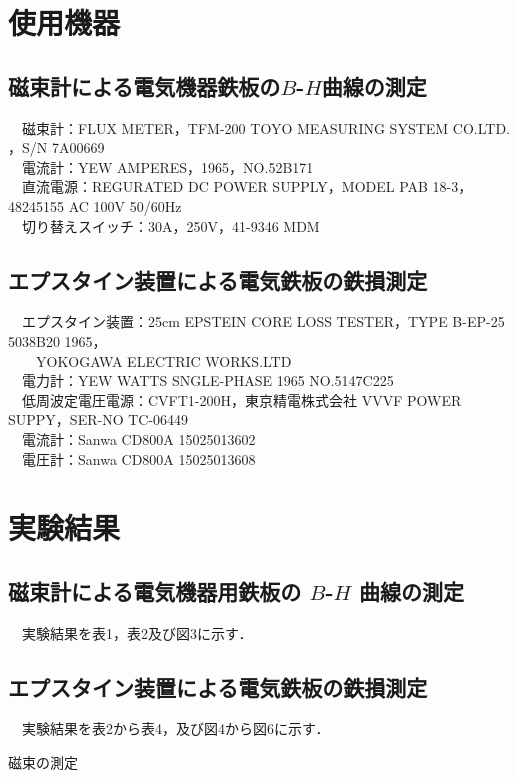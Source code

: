 \section{使用機器}
\subsection{磁束計による電気機器鉄板の$B$-$H$曲線の測定}
　磁束計：FLUX METER，TFM-200 TOYO MEASURING SYSTEM CO.LTD. ，S/N 7A00669\\
　電流計：YEW AMPERES，1965，NO.52B171\\
　直流電源：REGURATED DC POWER SUPPLY，MODEL PAB 18-3，48245155 AC 100V 50/60Hz\\
　切り替えスイッチ：30A，250V，41-9346 MDM\\

\subsection{エプスタイン装置による電気鉄板の鉄損測定}
　エプスタイン装置：25cm EPSTEIN CORE LOSS TESTER，TYPE B-EP-25 5038B20 1965，\\　　YOKOGAWA ELECTRIC WORKS.LTD\\
　電力計：YEW WATTS SNGLE-PHASE 1965 NO.5147C225\\
　低周波定電圧電源：CVFT1-200H，東京精電株式会社 VVVF POWER SUPPY，SER-NO TC-06449\\
　電流計：Sanwa CD800A 15025013602\\
　電圧計：Sanwa CD800A 15025013608\\


\section{実験結果}
\subsection{磁束計による電気機器用鉄板の $B$-$H$ 曲線の測定}
　実験結果を表1，表2及び図3に示す．\\

\subsection{エプスタイン装置による電気鉄板の鉄損測定}
　実験結果を表2から表4，及び図4から図6に示す．

\begin{landscape}
  \begin{table}[p]
    \centering
    \small
    \caption{磁束の測定}
    \scalebox{0.61} {
      
    }
  \end{table}
\end{landscape}

